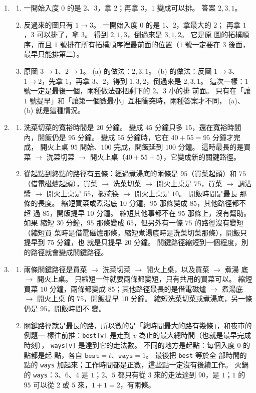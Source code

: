 \begin{enumerate}
\item
\begin{enumerate}
\item 一開始入度 $0$ 的是 $2$、$3$，拿 $2$；再拿 $3$，$1$ 變成可以排。 答案
$2, 3, 1$。
\item 反過來的圖只有 $1 \to 3$。 一開始入度 $0$ 的是 $1$、$2$，拿最大的 $2$；
再拿 $1$，$3$ 可以排了，拿 $3$。 得到 $2, 1, 3$，倒過來是 $3, 1, 2$。 它是原
圖的拓樸順序，而且 $1$ 號排在所有拓樸順序裡最前面的位置（$1$ 號一定要在 $3$
後面，最早只能排第二）。
\item 原圖 $3 \to 1$、$2 \to 1$。 (a) 的做法：$2, 3, 1$。 (b) 的做法：反圖
$1 \to 3$、$1 \to 2$，先拿 $1$，再拿 $3$、$2$，得到 $1, 3, 2$，倒過來是
$2, 3, 1$。 這次一樣：$1$ 號一定是最後一個，兩種做法都把剩下的 $2$、$3$ 小的排
前面。 只有在「讓 $1$ 號提早」和「讓第一個數最小」互相衝突時，兩種答案才不同，
(a)、(b) 就是這種情況。
\end{enumerate}

\item
\begin{enumerate}
\item 洗菜切菜的寬裕時間是 $20$ 分鐘。 變成 $45$ 分鐘只多 $15$，還在寬裕時間
內，開飯仍是 $95$ 分鐘。 變成 $55$ 分鐘時，它在 $40 + 55 = 95$ 分鐘才完成，
開火上桌 $95$ 開始、$100$ 完成，開飯延到 $100$ 分鐘。 這時最長的是買菜
$\to$ 洗菜切菜 $\to$ 開火上桌（$40 + 55 + 5$），它變成新的關鍵路徑。
\item 從起點到終點的路徑有五條：經過煮湯底的兩條是 $95$（買菜起頭）和 $75$
（借電磁爐起頭），買菜 $\to$ 洗菜切菜 $\to$ 開火上桌是 $75$，買菜 $\to$
調沾醬 $\to$ 開火上桌是 $55$，擺碗筷 $\to$ 開火上桌是 $10$。 開飯時間是最長
那條的長度。 縮短買菜或煮湯底 $10$ 分鐘，$95$ 那條變成 $85$，其他路徑都不超
過 $85$，開飯提早 $10$ 分鐘。 縮短其他事都不在 $95$ 那條上，沒有幫助。 如果
縮短 $30$ 分鐘，$95$ 那條變成 $65$，但另外有一條 $75$ 的路徑沒有變短（縮短買
菜時是借電磁爐那條，縮短煮湯底時是洗菜切菜那條），開飯只提早到 $75$ 分鐘，也
就是只提早 $20$ 分鐘。 關鍵路徑縮短到一個程度，別的路徑就會變成關鍵路徑。
\end{enumerate}

\item
\begin{enumerate}
\item 兩條關鍵路徑是買菜 $\to$ 洗菜切菜 $\to$ 開火上桌，以及買菜 $\to$ 煮湯
底 $\to$ 開火上桌。 只縮短一件就要兩條都變短，只有共用的買菜可以。 縮短買菜 $10$
分鐘，兩條都變成 $85$；其他路徑最長的是借電磁爐 $\to$ 煮湯底 $\to$ 開火上桌
的 $75$，開飯提早 $10$ 分鐘。 縮短洗菜切菜或煮湯底，另一條仍是 $95$，開飯時間不
變。
\item 關鍵路徑就是最長的路，所以數的是「總時間最大的路有幾條」，和夜市的例題一
樣往前推：\texttt{best[v]} 是走到 $v$ 為止的最大總時間（也就是最早完成時刻），
\texttt{ways[v]} 是達到它的走法數。 不同的地方是起點：每個入度 $0$ 的點都是起
點，各自 $\texttt{best} = t$、$\texttt{ways} = 1$。 最後把 \texttt{best} 等於全
部時間的點的 \texttt{ways} 加起來；工作時間都是正數，這些點一定沒有後續工作。
火鍋的 \texttt{ways}：$3$、$6$、$4$ 是 $1$；$2$、$5$ 都只有從 $3$ 來的走法達到
$90$，是 $1$；$1$ 的 $95$ 可以從 $2$ 或 $5$ 來，$1 + 1 = 2$，有兩條。
\end{enumerate}
\end{enumerate}
